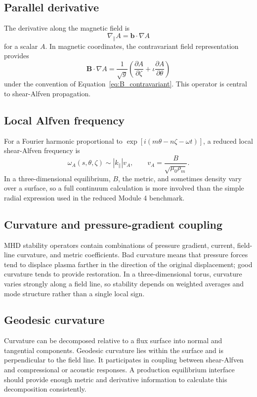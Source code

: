 \subsection{Parallel derivative}
The derivative along the magnetic field is
\begin{equation}
\nabla_\parallel A=\mathbf b\cdot\nabla A
\end{equation}
for a scalar $A$. In magnetic coordinates, the contravariant field representation provides
\begin{equation}
\mathbf B\cdot\nabla A
=\frac{1}{\sqrt g}
\left(\frac{\partial A}{\partial\zeta}
+\iota\frac{\partial A}{\partial\theta}\right)
\label{eq:Bdotgrad_straight}
\end{equation}
under the convention of Equation~\eqref{eq:B_contravariant}. This operator is central to shear-Alfven propagation.

\subsection{Local Alfven frequency}
For a Fourier harmonic proportional to $\exp[i(m\theta-n\zeta-\omega t)]$, a reduced local shear-Alfven frequency is
\begin{equation}
\omega_A(s,\theta,\zeta)
\sim |k_\parallel|v_A,
\qquad
v_A=\frac{B}{\sqrt{\mu_0\rho_m}}.
\end{equation}
In a three-dimensional equilibrium, $B$, the metric, and sometimes density vary over a surface, so a full continuum calculation is more involved than the simple radial expression used in the reduced Module 4 benchmark.

\subsection{Curvature and pressure-gradient coupling}
MHD stability operators contain combinations of pressure gradient, current, field-line curvature, and metric coefficients. Bad curvature means that pressure forces tend to displace plasma farther in the direction of the original displacement; good curvature tends to provide restoration. In a three-dimensional torus, curvature varies strongly along a field line, so stability depends on weighted averages and mode structure rather than a single local sign.

\subsection{Geodesic curvature}
Curvature can be decomposed relative to a flux surface into normal and tangential components. Geodesic curvature lies within the surface and is perpendicular to the field line. It participates in coupling between shear-Alfven and compressional or acoustic responses. A production equilibrium interface should provide enough metric and derivative information to calculate this decomposition consistently.

